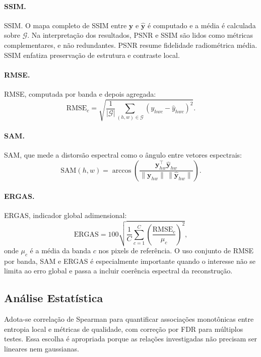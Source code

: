 \paragraph{SSIM.}
\gls{SSIM}.
O mapa completo de \gls{SSIM} entre $\mathbf{y}$ e $\hat{\mathbf{y}}$ é computado e a média é calculada sobre $\mathcal{G}$.
Na interpretação dos resultados, \gls{PSNR} e \gls{SSIM} são lidos como métricas complementares, e não redundantes.
\gls{PSNR} resume fidelidade radiométrica média.
\gls{SSIM} enfatiza preservação de estrutura e contraste local.

\paragraph{RMSE.}
\gls{RMSE}, computada por banda e depois agregada:
\[
  \text{RMSE}_c = \sqrt{\frac{1}{|\mathcal{G}|}
  \sum_{(h,w)\in\mathcal{G}} (y_{hwc} - \hat{y}_{hwc})^2}.
\]

\paragraph{SAM.}
\gls{SAM}, que mede a distorsão espectral como o ângulo entre vetores espectrais:
\[
  \text{SAM}(h,w) = \arccos\!\left(
    \frac{\mathbf{y}_{hw}^\top \hat{\mathbf{y}}_{hw}}
    {\|\mathbf{y}_{hw}\| \, \|\hat{\mathbf{y}}_{hw}\|}
  \right).
\]

\paragraph{ERGAS.}
\gls{ERGAS}, indicador global adimensional:
\[
  \text{ERGAS} = 100 \sqrt{
    \frac{1}{C} \sum_{c=1}^{C}
    \left(\frac{\text{RMSE}_c}{\mu_c}\right)^2
  },
\]
onde $\mu_c$ é a média da banda $c$ nos pixels de referência.
O uso conjunto de \gls{RMSE} por banda, \gls{SAM} e \gls{ERGAS} é especialmente importante quando o interesse não se limita ao erro global e passa a incluir coerência espectral da reconstrução.

\subsection{Análise Estatística}

Adota-se correlação de Spearman para quantificar associações monotônicas entre entropia local e métricas de qualidade, com correção por \gls{FDR} para múltiplos testes.
Essa escolha é apropriada porque as relações investigadas não precisam ser lineares nem gaussianas.

